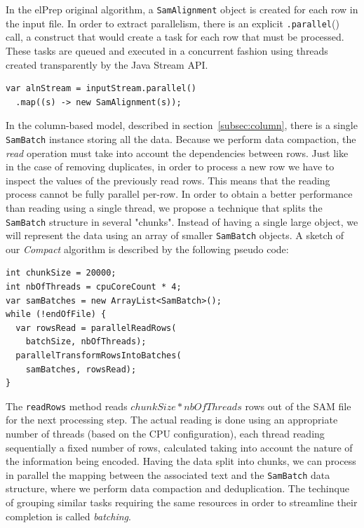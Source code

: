 \documentclass[a4paper,twoside]{article}
\begin{document}
In the elPrep original algorithm, a {\texttt{SamAlignment}} object is created for each row in the input file.
In order to extract parallelism, there is an explicit {\texttt{.parallel}()} call, a construct that would create a task for each row that must be processed.
These tasks are queued and executed in a concurrent fashion using threads created transparently by the Java Stream API.
\begin{verbatim}
var alnStream = inputStream.parallel()
  .map((s) -> new SamAlignment(s));
\end{verbatim}
In the column-based model, described in section~\ref{subsec:column}, there is a single {\texttt{SamBatch}} instance storing all the data.
Because we perform data compaction, the {\textit{read}} operation must take into account the dependencies between rows.
Just like in the case of removing duplicates, in order to process a new row we have to inspect the values of the previously read rows.
This means that the reading process cannot be fully parallel per-row.
In order to obtain a better performance than reading using a single thread, we propose a technique that splits the {\texttt{SamBatch}} structure in several "chunks".
Instead of having a single large object, we will represent the data using an array of smaller {\texttt{SamBatch}} objects.
A sketch of our {\textit{Compact}} algorithm is described by the following pseudo code:

\begin{verbatim}
int chunkSize = 20000;
int nbOfThreads = cpuCoreCount * 4;
var samBatches = new ArrayList<SamBatch>();
while (!endOfFile) {
  var rowsRead = parallelReadRows(
    batchSize, nbOfThreads);
  parallelTransformRowsIntoBatches(
    samBatches, rowsRead);
}
\end{verbatim}

The {\texttt{readRows}} method reads $chunkSize * nbOfThreads$ rows out of the SAM file for the next processing step.
The actual reading is done using an appropriate number of threads (based on the CPU configuration), each thread reading sequentially a fixed number of rows, calculated taking into account the nature of the information being encoded.
Having the data split into chunks, we can process in parallel the mapping between the associated text and the {\texttt{SamBatch}} data structure, where we perform data compaction and deduplication.
The techinque of grouping similar tasks requiring the same resources in order to streamline their completion is called {\textit{batching}}.
\end{document}
